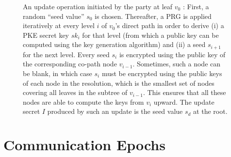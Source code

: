 \begin{figure}[h!]
\centering
\caption{%
\label{fig:CGKA-TreeKEM-Secrets}%
An update operation initiated by the party at leaf \(v_0\) : First, a random ``seed value'' \(s_0\) is chosen.
Thereafter, a PRG is applied iteratively at every level \(i\) of \(v_0\)'s direct path in order to derive
(i) a PKE secret key \(sk_i\) for that level (from which a public key can be computed using the key generation algorithm) and
(ii) a seed \(s_{i+1}\) for the next level.
Every seed \(s_i\) is encrypted using the public key of the corresponding co-path node \(v_{i-1}\).
Sometimes, such a node can be blank, in which case \(s_i\) must be encrypted using the public keys of each node in the resolution, which is the smallest set of nodes covering all leaves in the subtree of \(v_{i-1}\).
This ensures that all these nodes are able to compute the keys from \(v_i\) upward.
The update secret \(I\) produced by such an update is the seed value \(s_d\) at the root.
}%
{}
\end{figure}


\hypertarget{communication-epochs}{%
\section{Communication Epochs}\label{communication-epochs}}

